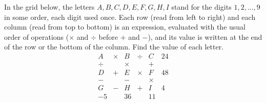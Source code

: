 In the grid below, the letters $A,B,C,D,E,F,G,H,I$ stand for the digits $1,2,\dots,9$ in some order, each digit used once. Each row (read from left to right) and each column (read from top to bottom) is an expression, evaluated with the usual order of operations ($\times$ and $\div$ before $+$ and $-$), and its value is written at the end of the row or the bottom of the column. Find the value of each letter.
\[\begin{array}{ccccc|c}
A&\times&B&\div&C&24\\
\div&&\times&&+&\\
D&+&E&\times&F&48\\
-&&-&&\times&\\
G&-&H&+&I&4\\\hline
-5&&36&&11&
\end{array}\]
